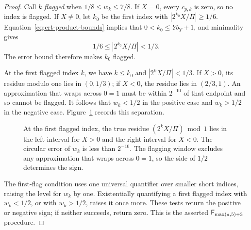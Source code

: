\begin{proof}
Call $k$ \emph{flagged} when $1/8\le w_k\le7/8$.  If $X=0$, every
$c_{p,k}$ is zero, so no index is flagged.  If $X\ne0$, let $k_0$ be
the first index with $|2^{k_0}X/\Pi|\ge1/6$.
Equation~\eqref{eq:crt-product-bounds} implies that
$0<k_0\le Yb_Y+1$, and minimality gives
\[
 1/6\le|2^{k_0}X/\Pi|<1/3.
\]
The error bound therefore makes $k_0$ flagged.

At the first flagged index $k$, we have $k\le k_0$ and
$|2^kX/\Pi|<1/3$.  If $X>0$, its residue modulo one lies in $(0,1/3)$;
if $X<0$, the residue lies in $(2/3,1)$.  An approximation that wraps
across $0=1$ must be within $2^{-10}$ of that endpoint and so cannot be
flagged.  It follows that $w_k<1/2$ in the positive case and $w_k>1/2$
in the negative case.  Figure~\ref{fig:crt-sign} records this separation.

\begin{figure}[tb]
\centering
{}
\caption{At the first flagged index, the true residue
$(2^kX/\Pi)\bmod1$ lies in the left interval for $X>0$ and the right
interval for $X<0$.  The circular error of $w_k$ is less than $2^{-10}$.
The flagging window excludes any approximation that wraps across $0=1$,
so the side of $1/2$ determines the sign.}
\label{fig:crt-sign}
\end{figure}

The first-flag condition uses one universal quantifier over smaller
short indices, raising the level for $w_k$ by one.  Existentially
quantifying a first flagged index with $w_k<1/2$, or with $w_k>1/2$,
raises it once more.  These tests return the positive or negative sign;
if neither succeeds, return zero.  This is the asserted
$\mathsf F_{\max(a,5)+3}$ procedure.
\end{proof}

